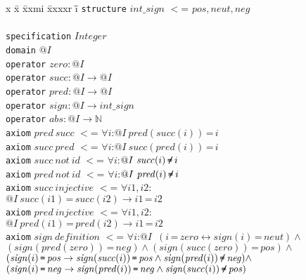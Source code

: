 \documentclass{article}
\theoremstyle{remark}
\theoremstyle{definition}
\newcommand{\ieq}{\,\texttt{=}\,}
\newcommand{\ineq}{\,\texttt{=\hspace{-0.16cm}/\hspace{-0.01cm}}\,}
\newcommand{\nat}{\mathbb{N}}
\newcommand{\name}[1]{\mathit{#1}}
\begin{document}
\begin{figure}[t]
\begin{tabbing}
x \= x \= xxmi \= xxxxr \=i\= \kill
\texttt{structure} $\name{int\_sign}$ $<$= $\name{pos}, \name{neut}, \name{neg}$\\
\\
\texttt{specification} $\name{Integer}$ \\
\> \texttt{domain} $@I$ \\
\> \texttt{operator} $\name{zero}: @I$ \\
\> \texttt{operator} $\name{succ}: @I \rightarrow @I$ \\
\> \texttt{operator} $\name{pred}: @I \rightarrow @I$ \\
\> \texttt{operator} $\name{sign}: @I \rightarrow \name{int\_sign}$ \\
\> \texttt{operator} $\name{abs}: @I \rightarrow \nat$ \\
\> \texttt{axiom} $\name{pred}\ \name{succ}$ $<$= $\forall i$:$@I\ \name{pred}(\name{succ}(i))\ieq i$ \\
\> \texttt{axiom} $\name{succ}\ \name{pred}$ $<$= $\forall i$:$@I\ \name{succ}(\name{pred}(i))\ieq i$ \\
\> \texttt{axiom} $\name{succ}\ \name{not}\ \name{id}$ $<$= $\forall i$:$@I\ \name{succ}(i)\ineq i$ \\
\> \texttt{axiom} $\name{pred}\ \name{not}\ \name{id}$ $<$= $\forall i$:$@I\ \name{pred}(i)\ineq i$ \\
\> \texttt{axiom} $\name{succ}\ \name{injective}$ $<$= $\forall \name{i1},\name{i2}$:$@I\ \name{succ}(\name{i1})\ieq\name{succ}(\name{i2}) \rightarrow \name{i1}\ieq\name{i2}$ \\
\> \texttt{axiom} $\name{pred}\ \name{injective}$ $<$= $\forall \name{i1},\name{i2}$:$@I\ \name{pred}(\name{i1})\ieq\name{pred}(\name{i2}) \rightarrow \name{i1}\ieq\name{i2}$ \\
\> \texttt{axiom} $\name{sign}\ \name{definition}$ $<$= $\forall i$:$@I$\  $(i\ieq\name{zero} \leftrightarrow \name{sign}(i)\ieq\name{neut}) \wedge$ \\
\> \> $(\name{sign}(\name{pred}(\name{zero}))\ieq\name{neg}) \wedge (\name{sign}(\name{succ}(\name{zero}))\ieq\name{pos}) \wedge$ \\
\> \> $(\name{sign}(i)\ieq\name{pos} \rightarrow \name{sign}(\name{succ}(i))\ieq\name{pos} \wedge \name{sign}(\name{pred}(i))\ineq \name{neg}) \wedge$ \\
\> \> $(\name{sign}(i)\ieq\name{neg} \rightarrow \name{sign}(\name{pred}(i))\ieq\name{neg} \wedge \name{sign}(\name{succ}(i))\ineq \name{pos})$ \\

\end{tabbing}
\end{figure}
\end{document}
